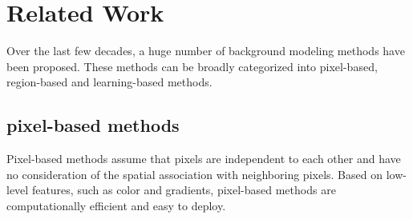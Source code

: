 \documentclass[journal]{IEEEtran}
\begin{document}
\section{Related Work}
\label{sec2}
Over the last few decades, a huge number of background modeling methods have been proposed. 
These methods can be broadly categorized into pixel-based, region-based and learning-based methods.
\subsection{pixel-based methods}
Pixel-based methods assume that pixels are independent to each other and have no consideration of the spatial association with neighboring pixels. 
Based on low-level features, such as color and gradients, pixel-based methods are computationally efficient and easy to deploy. 
\end{document}
